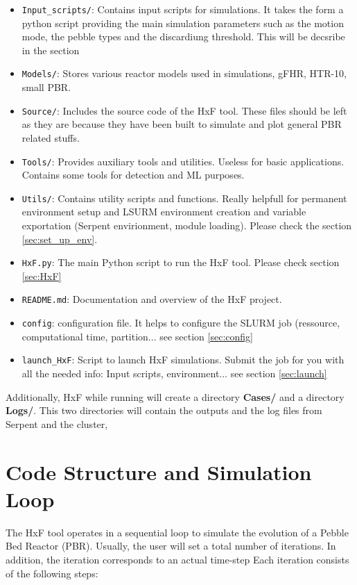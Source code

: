 \documentclass{article}
\begin{document}
\begin{itemize}
    \item \texttt{Input\_scripts/}: Contains input scripts for simulations. It takes the form a python script providing the main simulation parameters such as the motion mode, the pebble types and the discardiung threshold. This will be decsribe in the section 
    \item \texttt{Models/}: Stores various reactor models used in simulations, gFHR, HTR-10, small PBR.
    \item \texttt{Source/}: Includes the source code of the HxF tool. These files should be left as they are because they have been built to simulate and plot general PBR related stuffs. 
    \item \texttt{Tools/}: Provides auxiliary tools and utilities. Useless for basic applications. Contains some tools for detection and ML purposes.
    \item \texttt{Utils/}: Contains utility scripts and functions. Really helpfull for permanent environment setup and LSURM environment creation and variable exportation (Serpent envirionment, module loading). Please check the section \ref{sec:set_up_env}.
    \item \texttt{HxF.py}: The main Python script to run the HxF tool. Please check section \ref{sec:HxF}
    \item \texttt{README.md}: Documentation and overview of the HxF project.
    \item \texttt{config}: configuration file. It helps to configure the SLURM job (ressource, computational time, partition... see section \ref{sec:config}
    \item \texttt{launch\_HxF}: Script to launch HxF simulations. Submit the job for you with all the needed info: Input scripts, environment... see section \ref{sec:launch}
\end{itemize}

Additionally, HxF while running will create a directory \textbf{Cases/} and a directory \textbf{Logs/}. This two directories will contain the outputs and the log files from Serpent and the cluster, 
\newpage

\section{Code Structure and Simulation Loop}

The HxF tool operates in a sequential loop to simulate the evolution of a Pebble Bed Reactor (PBR). Usually, the user will set a total number of iterations. In addition, the iteration corresponds to an actual time-step  Each iteration consists of the following steps:
\end{document}
